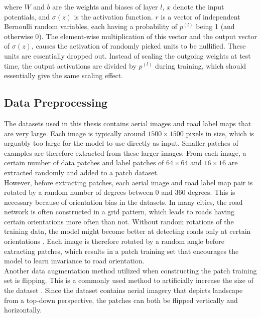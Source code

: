 \noindent where $W$ and $b$ are the weights and biases of layer $l$, $x$ denote the input potentials, and $\sigma(z)$ is the activation function. $r$ is a vector of independent Bernoulli random variables, each having a probability of $p^{(l)}$ being 1 (and otherwise 0). The element-wise multiplication of this vector and the output vector of $\sigma(z)$, causes the activation of randomly picked units to be nullified. These units are essentially dropped out. Instead of scaling the outgoing weights at test time, the output activations are divided by $p^{(l)}$  during training, which should essentially give the same scaling effect.\\


\subsection{Data Preprocessing}
The datasets used in this thesis contains aerial images and road label maps that are very large. Each image is typically around $1500 \times 1500$ pixels in size, which is arguably too large for the model to use directly as input. Smaller patches of examples are therefore extracted from these larger images. From each image, a certain number of data patches and label patches of $64 \times 64$ and $16 \times 16$ are extracted randomly and added to a patch dataset.\\

However, before extracting patches, each aerial image and road label map pair is rotated by a random number of degrees between 0 and 360 degrees. This is necessary because of orientation bias in the datasets. In many cities, the road network is often constructed in a grid pattern, which leads to roads having certain orientations more often than not. Without random rotations of the training data, the model might become better at detecting roads only at certain orientations \citep{Mnih_roads_high_res_aerial_images}. Each image is therefore rotated by a random angle before extracting patches, which results in a patch training set that encourages the model to learn invariance to road orientation.\\

Another data augmentation method utilized when constructing the patch training set is flipping. This is a commonly used method to artificially increase the size of the dataset \citep{Krizhevsky_imagenet}. Since the dataset contains aerial imagery that depicts landscape from a top-down perspective, the patches can both be flipped vertically and horizontally.\\

